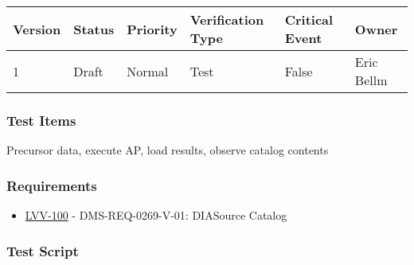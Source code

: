 \begin{longtable}[]{@{}llllll@{}}
\toprule
Version & Status & Priority & Verification Type & Critical Event &
Owner\tabularnewline
\midrule
\endhead
1 & Draft & Normal & Test & False & Eric Bellm\tabularnewline
\bottomrule
\end{longtable}

\hypertarget{test-items-138}{%
\subsubsection{Test Items}\label{test-items-138}}

Precursor data, execute AP, load results, observe catalog contents

\hypertarget{requirements-139}{%
\subsubsection{Requirements}\label{requirements-139}}

\begin{itemize}
\tightlist
\item
  \href{https://jira.lsstcorp.org/browse/LVV-100}{LVV-100} -
  DMS-REQ-0269-V-01: DIASource Catalog
\end{itemize}

\hypertarget{test-script-139}{%
\subsubsection{Test Script}\label{test-script-139}}

